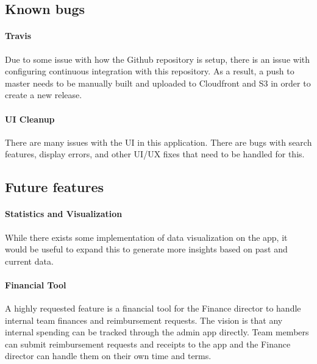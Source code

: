 \documentclass[twoside, 12pt]{article}
\begin{document}
\subsection{Known bugs}
\paragraph{Travis}
\par Due to some issue with how the Github repository is setup, there is an issue with configuring continuous integration with this repository. As a result, a push to master needs to be manually built and uploaded to Cloudfront and S3 in order to create a new release.
\paragraph{UI Cleanup}
\par There are many issues with the UI in this application. There are bugs with search features, display errors, and other UI/UX fixes that need to be handled for this.
\subsection{Future features}
\paragraph{Statistics and Visualization}
\par While there exists some implementation of data visualization on the app, it would be useful to expand this to generate more insights based on past and current data.
\paragraph{Financial Tool}
\par A highly requested feature is a financial tool for the Finance director to handle internal team finances and reimbursement requests. The vision is that any internal spending can be tracked through the admin app directly. Team members can submit reimbursement requests and receipts to the app and the Finance director can handle them on their own time and terms.

\clearpage
{\small

}
\end{document}
